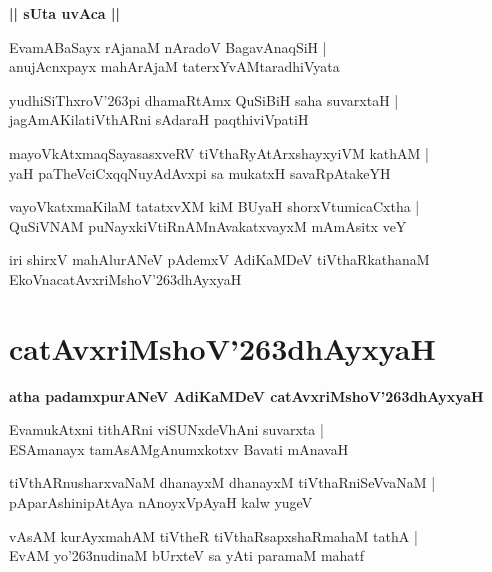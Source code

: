 \documentclass[twoside,12pt,openright]{book}
\def\S{\char'263}
\newcounter{shloka}[chapter]
\def\uvaca#1{\centerline{{\large\textbf{#1}}}}
\begin{document}
\uvaca{|| sUta uvAca ||}

\begin{shloka}
EvamABaSayx rAjanaM nAradoV BagavAnaqSiH |\\
anujAcnxpayx mahArAjaM taterxYvAMtaradhiVyata
\end{shloka}

\begin{shloka}
yudhiSiThxroV\S pi dhamaRtAmx QuSiBiH saha suvarxtaH |\\
jagAmAKilatiVthARni sAdaraH paqthiviVpatiH 
\end{shloka}

\begin{shloka}
mayoVkAtxmaqSayasasxveRV tiVthaRyAtArxshayxyiVM kathAM |\\
yaH paTheVciCxqqNuyAdAvxpi sa mukatxH savaRpAtakeYH 
\end{shloka}

\begin{shloka}
vayoVkatxmaKilaM tatatxvXM kiM BUyaH shorxVtumicaCxtha |\\
QuSiVNAM puNayxkiVtiRnAMnAvakatxvayxM mAmAsitx veY 
\end{shloka}

\begin{center}
iri shirxV mahAlurANeV pAdemxV AdiKaMDeV tiVthaRkathanaM EkoVnacatAvxriMshoV\S dhAyxyaH 
\end{center}

\chapter{catAvxriMshoV\S dhAyxyaH}

\begin{center}
{\LARGE\bfseries atha padamxpurANeV AdiKaMDeV catAvxriMshoV\S dhAyxyaH}
\end{center}

\begin{shloka}
EvamukAtxni tithARni viSUNxdeVhAni suvarxta |\\
ESAmanayx tamAsAMgAnumxkotxv Bavati mAnavaH 
\end{shloka}

\begin{shloka}
tiVthARnusharxvaNaM dhanayxM dhanayxM tiVthaRniSeVvaNaM |\\
pAparAshinipAtAya nAnoyxVpAyaH kalw yugeV 
\end{shloka}

\begin{shloka}
vAsAM kurAyxmahAM tiVtheR tiVthaRsapxshaRmahaM tathA |\\
EvAM yo\S nudinaM bUrxteV sa yAti paramaM mahatf 
\end{shloka}
\end{document}
